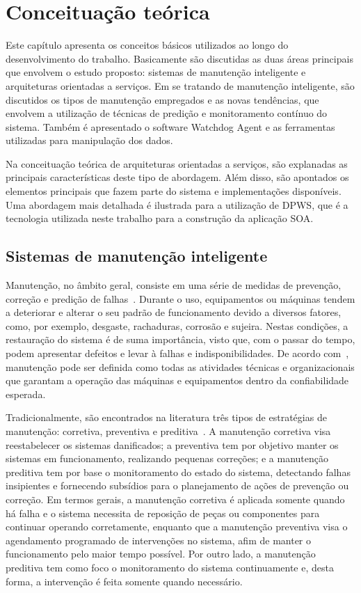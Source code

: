 \chapter{Conceituação teórica}
\label{cha:conceituacao-teorica}

Este capítulo apresenta os conceitos básicos utilizados ao longo do desenvolvimento do trabalho.
Basicamente são discutidas as duas áreas principais que envolvem o estudo proposto: sistemas de
manutenção inteligente e arquiteturas orientadas a serviços. Em se tratando de manutenção
inteligente, são discutidos os tipos de manutenção empregados e as novas tendências, que envolvem a
utilização de técnicas de predição e monitoramento contínuo do sistema. Também é apresentado o
software Watchdog Agent e as ferramentas utilizadas para manipulação dos dados.

Na conceituação teórica de arquiteturas orientadas a serviços, são explanadas as principais
características deste tipo de abordagem. Além disso, são apontados os elementos principais que fazem
parte do sistema e implementações disponíveis. Uma abordagem mais detalhada é ilustrada para a
utilização de \gls{DPWS}, que é a tecnologia utilizada neste trabalho para a construção da aplicação
\gls{SOA}.


\section{Sistemas de manutenção inteligente}
\label{sec:manutencao-inteligente}

Manutenção, no âmbito geral, consiste em uma série de medidas de prevenção, correção e predição de
falhas~\cite{lee2006intelligent}. Durante o uso, equipamentos ou máquinas tendem a deteriorar e
alterar o seu padrão de funcionamento devido a diversos fatores, como, por exemplo, desgaste,
rachaduras, corrosão e sujeira. Nestas condições, a restauração do sistema é de suma importância,
visto que, com o passar do tempo, podem apresentar defeitos e levar à falhas e indisponibilidades.
De acordo com~\cite{marcal2005detectando}, manutenção pode ser definida como todas as atividades
técnicas e organizacionais que garantam a operação das máquinas e equipamentos dentro da
confiabilidade esperada.

Tradicionalmente, são encontrados na literatura três tipos de estratégias de
manutenção: corretiva, preventiva e preditiva~\cite{goncalves2011desenvolvimento}. A manutenção
corretiva visa reestabelecer os sistemas danificados; a preventiva tem por objetivo manter os
sistemas em funcionamento, realizando pequenas correções; e a manutenção preditiva tem por base o
monitoramento do estado do sistema, detectando falhas insipientes e fornecendo subsídios para o
planejamento de ações de prevenção ou correção. Em termos gerais, a manutenção corretiva é aplicada
somente quando há falha e o sistema necessita de reposição de peças ou componentes para continuar
operando corretamente, enquanto que a manutenção preventiva visa o agendamento programado de
intervenções no sistema, afim de manter o funcionamento pelo maior tempo possível. Por outro lado, a
manutenção preditiva tem como foco o monitoramento do sistema continuamente e, desta forma, a
intervenção é feita somente quando necessário.

